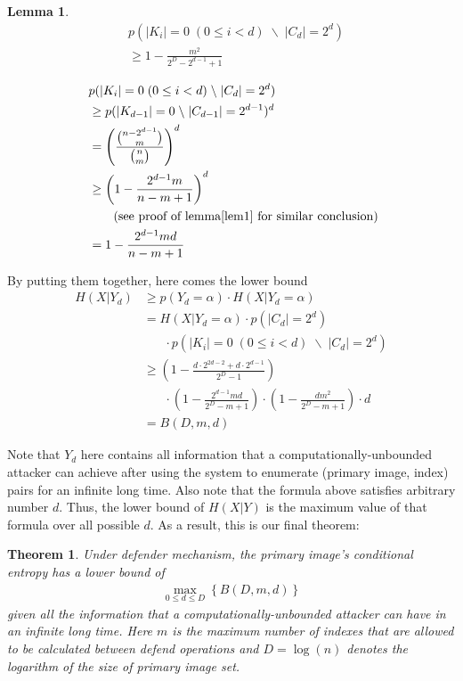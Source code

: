 \documentclass[10pt, conference, compsocconf]{IEEEtran}
\newtheorem{mylemma}{Lemma}
\newtheorem{mytheorem}{Theorem}
\begin{document}
		\begin{mylemma}
			\begin{align*}
			&p(|K_i| = 0	\; (0 \leq i < d) \; \backslash \; |C_d| = 2^d) \\
				&\geq 1-\frac{m^2}{2^D-2^{d-1}+1}
			\end{align*}
		\end{mylemma}
		
		\begin{IEEEproof}
			\begin{align*}
				&p(|K_i| = 0	\; (0 \leq i < d) \; \backslash \; |C_d| = 2^d) \\\
					&\geq p(|K_{d-1}| = 0 \; \backslash \; |C_{d-1}| = 2^{d-1})^d\\
					&= \left(\frac{\binom{n-2^{d-1}}{m}}{\binom{n}{m}} \right)^d\\
					&\geq \left(1-\frac{2^{d-1}m}{n-m+1}\right)^d	\; \\
					& \;\;\;\;\;\; \text{ (see proof of lemma\ref{lem1} for similar conclusion})\\
					&= 1-\frac{2^{d-1}m d}{n-m+1}
			\end{align*}
		\end{IEEEproof}
		
		By putting them together, here comes the lower bound
		\begin{align*}
			H(X | Y_d) &\geq p(Y_d = \alpha) \cdot H(X | Y_d = \alpha)\\
				&= H(X | Y_d = \alpha) \cdot p(|C_d| = 2^d) \\
					&\;\;\;\;\;\; \cdot p(|K_i| = 0	\; (0 \leq i < d) \; \backslash \; |C_d| = 2^d) \\
				&\geq (1-\frac{d \cdot 2^{2d-2}+d \cdot 2^{d-1}}{2^D-1})\\
					&\;\;\;\;\;\; \cdot (1-\frac{2^{d-1}m d}{2^D-m+1}) 
					\cdot (1-\frac{dm^2}{2^D-m+1}) \cdot d \\
				&= B(D, m, d)
		\end{align*}
		
		Note that $Y_d$ here contains all
		information that a computationally-unbounded
		attacker can achieve after
		using the system to enumerate (primary image, index) pairs
		for an infinite long time. Also note that the formula above
		satisfies arbitrary number $d$. Thus, the lower bound
		of $H(X | Y)$ is the maximum value of that formula
		over all possible $d$.
		As a result, this is our final theorem:
		\begin{mytheorem}\label{thm1}
			Under defender mechanism,
			the primary image's conditional entropy has a lower bound of
			\begin{align*}
				\max_{0 \leq d \leq D} \left\{ B(D, m, d) \right\}
			\end{align*}
			given all the information
			that a computationally-unbounded attacker can
			have in an infinite long time. Here $m$ is
			the maximum number of indexes that are allowed to be calculated
			between defend operations and $D = \log(n)$ denotes the
			logarithm of the size of primary image set.
		\end{mytheorem}
		
\end{document}
